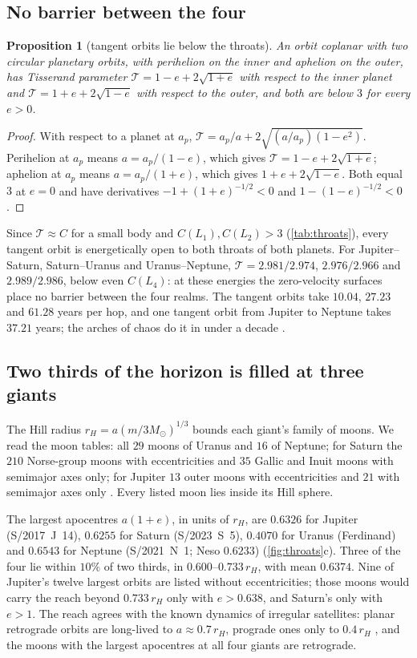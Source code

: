 \documentclass[11pt]{article}
\newtheorem{proposition}[theorem]{Proposition}
\theoremstyle{definition}\newtheorem{definition}[theorem]{Definition}
\theoremstyle{remark}\newtheorem{remark}[theorem]{Remark}
\begin{document}
\subsection{No barrier between the four}\label{sec:chain}
\begin{proposition}[tangent orbits lie below the throats]\label{prop:tisserand}
An orbit coplanar with two circular planetary orbits, with perihelion on the inner and aphelion on the outer, has Tisserand parameter $\mathcal T=1-e+2\sqrt{1+e}$ with respect to the inner planet and $\mathcal T=1+e+2\sqrt{1-e}$ with respect to the outer, and both are below $3$ for every $e>0$.
\end{proposition}
\begin{proof}
With respect to a planet at $a_p$, $\mathcal T=a_p/a+2\sqrt{(a/a_p)(1-e^2)}$. Perihelion at $a_p$ means $a=a_p/(1-e)$, which gives $\mathcal T=1-e+2\sqrt{1+e}$; aphelion at $a_p$ means $a=a_p/(1+e)$, which gives $1+e+2\sqrt{1-e}$. Both equal $3$ at $e=0$ and have derivatives $-1+(1+e)^{-1/2}<0$ and $1-(1-e)^{-1/2}<0$.
\end{proof}
Since $\mathcal T\approx C$ for a small body and $C(L_1),C(L_2)>3$ (\cref{tab:throats}), every tangent orbit is energetically open to both throats of both planets. For Jupiter--Saturn, Saturn--Uranus and Uranus--Neptune, $\mathcal T=2.981/2.974$, $2.976/2.966$ and $2.989/2.986$, below even $C(L_4)$: at these energies the zero-velocity surfaces place no barrier between the four realms. The tangent orbits take $10.04$, $27.23$ and $61.28$ years per hop, and one tangent orbit from Jupiter to Neptune takes $37.21$ years; the arches of chaos do it in under a decade \cite{Todorovic}.

\subsection{Two thirds of the horizon is filled at three giants}\label{sec:reach}
The Hill radius $r_H=a(m/3M_\odot)^{1/3}$ bounds each giant's family of moons. We read the moon tables: all $29$ moons of Uranus and $16$ of Neptune; for Saturn the $210$ Norse-group moons with eccentricities and $35$ Gallic and Inuit moons with semimajor axes only; for Jupiter $13$ outer moons with eccentricities and $21$ with semimajor axes only \cite{WikiMoons}. Every listed moon lies inside its Hill sphere.

The largest apocentres $a(1+e)$, in units of $r_H$, are $0.6326$ for Jupiter (S/2017~J~14), $0.6255$ for Saturn (S/2023~S~5), $0.4070$ for Uranus (Ferdinand) and $0.6543$ for Neptune (S/2021~N~1; Neso $0.6233$) (\cref{fig:throats}c). Three of the four lie within $10\%$ of two thirds, in $0.600$--$0.733\,r_H$, with mean $0.6374$. Nine of Jupiter's twelve largest orbits are listed without eccentricities; those moons would carry the reach beyond $0.733\,r_H$ only with $e>0.638$, and Saturn's only with $e>1$. The reach agrees with the known dynamics of irregular satellites: planar retrograde orbits are long-lived to $a\approx0.7\,r_H$, prograde ones only to $0.4\,r_H$ \cite{Nesvorny03}, and the moons with the largest apocentres at all four giants are retrograde.
\end{document}
